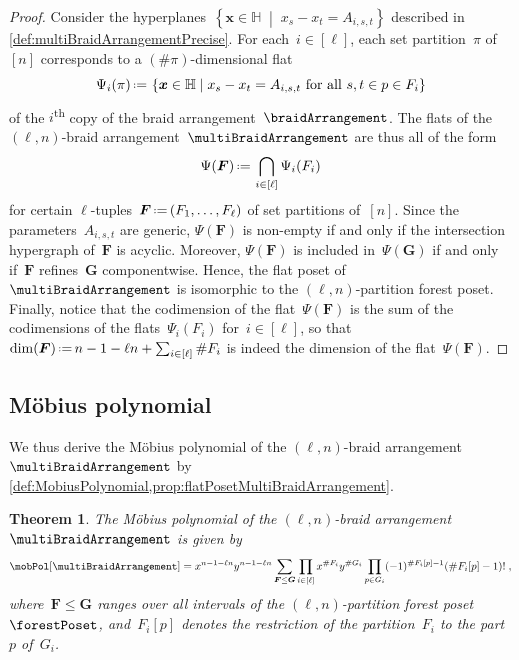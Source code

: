 \documentclass{amsart}
\newtheorem{theorem}{Theorem}[section]
\theoremstyle{definition}
\renewcommand{\b}[1]{{\boldsymbol{#1}}} %
\newcommand{\set}[2]{\left\{ #1 \;\middle|\; #2 \right\}} %
\newcommand{\eqdef}{\mbox{\,\raisebox{0.2ex}{\scriptsize\ensuremath{\mathrm:}}\ensuremath{=}\,}} %
\newcommand{\ordinal}{\textsuperscript{th}} %
\renewcommand{\b}[1]{\boldsymbol{#1}} %
\newcommand{\HH}{\mathbb{H}} %
\begin{document}
\begin{proof}
Consider the hyperplanes~$\set{\b{x} \in \HH}{x_s - x_t = A_{i,s,t}}$ described in \cref{def:multiBraidArrangementPrecise}.
For each~${i \in [\ell]}$, each set partition~$\pi$ of~$[n]$ corresponds to a $(\#\pi)$-dimensional flat
\[
\Psi_i(\pi) \eqdef \set{\b{x} \in \HH}{x_s - x_t = A_{i,s,t} \text{ for all } s,t \in p \in F_i }
\]
of the $i$\ordinal{} copy of the braid arrangement~$\braidArrangement$.
The flats of the $(\ell,n)$-braid arrangement~$\multiBraidArrangement$ are thus all of the form
\[
\Psi(\b{F}) \eqdef \bigcap_{i \in [\ell]} \Psi_i(F_i)
\]
for certain $\ell$-tuples~$\b{F} \eqdef (F_1, \dots, F_\ell)$ of set partitions of~$[n]$.
Since the parameters~$A_{i,s,t}$ are generic, $\Psi(\b{F})$ is non-empty if and only if the intersection hypergraph of~$\b{F}$ is acyclic.
Moreover, $\Psi(\b{F})$ is included in~$\Psi(\b{G})$ if and only if~$\b{F}$ refines~$\b{G}$ componentwise.
Hence, the flat poset of~$\multiBraidArrangement$ is isomorphic to the $(\ell,n)$-partition forest poset.
Finally, notice that the codimension of the flat~$\Psi(\b{F})$ is the sum of the codimensions of the flats~$\Psi_i(F_i)$ for~$i \in [\ell]$, so that~$\dim(\b{F}) \eqdef n - 1 - \ell n + \sum_{i \in [\ell]} \#F_i $ is indeed the dimension of the flat~$\Psi(\b{F})$.
\end{proof}


\subsection{M\"obius polynomial}
\label{subsec:MobiusPolynomialMultiBraidArrangement}

We thus derive the M\"obius polynomial of the $(\ell,n)$-braid arrangement~$\multiBraidArrangement$ by \cref{def:MobiusPolynomial,prop:flatPosetMultiBraidArrangement}.

\begin{theorem}
\label{thm:MobiusPolynomialMultiBraidArrangement}
The M\"obius polynomial of the $(\ell,n)$-braid arrangement~$\multiBraidArrangement$ is given by
\[
\mobPol[\multiBraidArrangement] = x^{n-1-\ell n} y^{n-1-\ell n} \sum_{\b{F} \le \b{G}} \prod_{i \in [\ell]} x^{\#F_i} y^{\#G_i} \prod_{p \in G_i} (-1)^{\#F_i[p]-1} (\# F_i[p]-1)! \; ,
\]
where~$\b{F} \le \b{G}$ ranges over all intervals of the $(\ell,n)$-partition forest poset~$\forestPoset$, and~$F_i[p]$ denotes the restriction of the partition~$F_i$ to the part~$p$ of~$G_i$.
\end{theorem}
\end{document}
